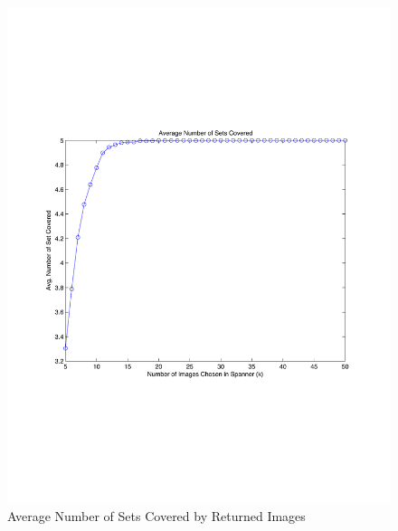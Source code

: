 \begin{figure} 
\begin{centering}
    \includegraphics[scale=0.35]{figures/50_image_sets/percCoverage_50_images.pdf}
    \caption{Average Number of Sets Covered by Returned Images}
    \label{fig:spannerAvgNumSetsCov}
\end{centering}
\end{figure}

